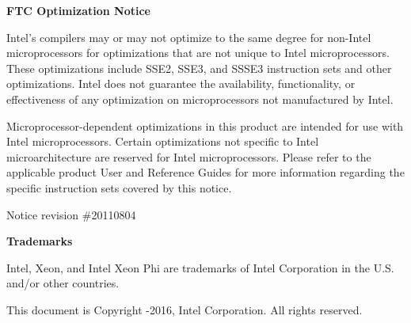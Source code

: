 \documentclass{book}
\begin{document}
\hypersetup{pageanchor=false,citecolor=blue}

{\bf FTC Optimization Notice}

Intel's compilers may or may not optimize to the same degree for non-Intel microprocessors for
optimizations that are not unique to Intel microprocessors. These optimizations include SSE2,
SSE3, and SSSE3 instruction sets and other optimizations. Intel does not guarantee the
availability, functionality, or effectiveness of any optimization on microprocessors not
manufactured by Intel.

Microprocessor-dependent optimizations in this product are intended for use with Intel
microprocessors. Certain optimizations not specific to Intel microarchitecture are reserved for
Intel microprocessors. Please refer to the applicable product User and Reference Guides for
more information regarding the specific instruction sets covered by this notice.

Notice revision \#20110804

\vspace*{0.5cm}

{\bf Trademarks}

Intel, Xeon, and Intel Xeon Phi are trademarks of Intel Corporation in the U.S. and/or other countries.

This document is Copyright -2016, Intel Corporation. All rights reserved.

\tableofcontents
{}
\hypersetup{pageanchor=true,citecolor=blue}
\end{document}
